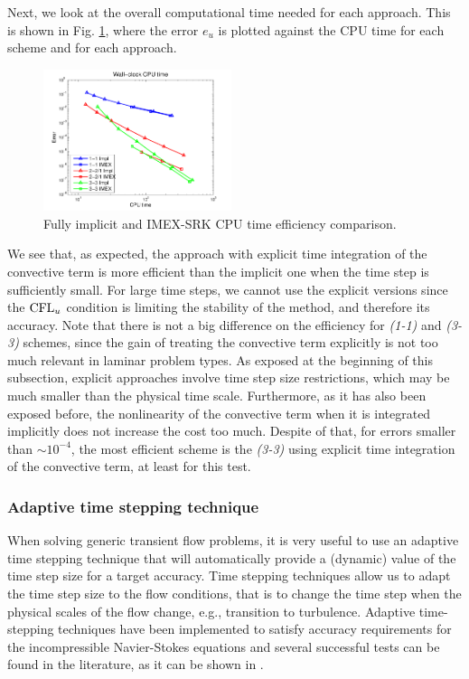 Next, we look at the overall computational time needed for each approach. This is shown in Fig. \ref{fig:IMEX_RK_cyl_effi_impl_expl}, where the error $e_u$ is plotted against the CPU time for each scheme and for each approach.
\begin{figure}[h!]
  \centering
  \includegraphics[width=0.49\textwidth]{Figures/Chapter6/cylinder/Efficiency_impl_expl}  
  \caption{Fully implicit and IMEX-SRK CPU time efficiency comparison.}
  \label{fig:IMEX_RK_cyl_effi_impl_expl}
\end{figure}
We see that, as expected, the approach with explicit time integration of the convective term is more efficient than the implicit one when the time step is sufficiently small. For large time steps, we cannot use the explicit versions since the ${\rm CFL}_u$ condition is limiting the stability of the method, and therefore its accuracy. Note that there is not a big difference on the efficiency for \textit{(1-1)} and \textit{(3-3)} schemes, since the gain of treating the convective term explicitly is not too much relevant in laminar problem types. As exposed at the beginning of this subsection, explicit approaches involve time step size restrictions, which may be much smaller than the physical time scale. Furthermore, as it has also been exposed before, the nonlinearity of the convective term when it is integrated implicitly does not increase the cost too much. Despite of that, for errors smaller than $\sim10^{-4}$, the most efficient scheme is the \textit{(3-3)} using explicit time integration of the convective term, at least for this test.

\subsubsection{Adaptive time stepping technique}
When solving generic transient flow problems, it is very useful to use an adaptive time stepping technique that will automatically provide a (dynamic) value of the time step size for a target accuracy. Time stepping techniques allow us to adapt the time step size to the flow conditions, that is to change the time step when the physical scales of the flow change, e.g., transition to turbulence. Adaptive time-stepping techniques have been implemented to satisfy accuracy requirements for the incompressible Navier-Stokes equations and several successful tests can be found in the literature, as it can be shown in \cite{feng_time-adaptive_2000,john_adaptive_2010,kay_adaptive_2010,veneziani_aladins:_2013}. 

